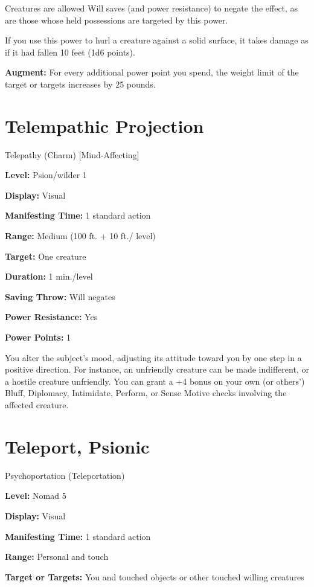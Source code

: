 \documentclass{article}
\begin{document}
Creatures are allowed Will saves (and power resistance) to negate the effect, as 
are those whose held possessions are targeted by this power.

If you use this power to hurl a creature against a solid surface, it takes damage 
as if it had fallen 10 feet (1d6 points).

\textbf{Augment:} For every additional power point you spend, the weight limit 
of the target or targets increases by 25 pounds.

\vspace{12pt}
\section*{Telempathic Projection}

Telepathy (Charm) [Mind-Affecting]

\textbf{Level:} Psion/wilder 1

\textbf{Display:} Visual

\textbf{Manifesting Time:} 1 standard action

\textbf{Range:} Medium (100 ft. + 10 ft./ level)

\textbf{Target:} One creature

\textbf{Duration:} 1 min./level

\textbf{Saving Throw:} Will negates

\textbf{Power Resistance:} Yes

\textbf{Power Points:} 1

You alter the subject's mood, adjusting its attitude toward you by one step in 
a positive direction. For instance, an unfriendly creature can be made indifferent, 
or a hostile creature unfriendly. You can grant a +4 bonus on your own (or others') 
Bluff, Diplomacy, Intimidate, Perform, or Sense Motive checks involving the affected 
creature.

\vspace{12pt}
\section*{Teleport, Psionic}

Psychoportation (Teleportation)

\textbf{Level:} Nomad 5

\textbf{Display:} Visual

\textbf{Manifesting Time:} 1 standard action

\textbf{Range:} Personal and touch

\textbf{Target or Targets:} You and touched objects or other touched willing creatures
\end{document}
